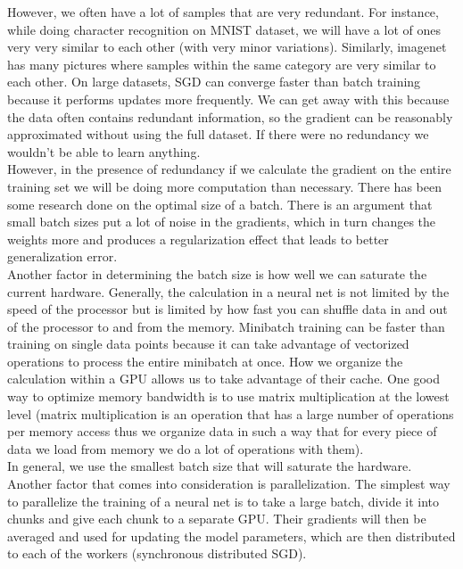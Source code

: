 However, we often have a lot of samples that are very redundant. For instance, while doing character recognition on MNIST dataset, we will have a lot of ones very very similar to each other (with very minor variations). Similarly, imagenet has many pictures where samples within the same category are very similar to each other. On large datasets, SGD can converge faster than batch training because it performs updates more frequently. We can get away with this because the data often contains redundant information, so the gradient can be reasonably approximated without using the full dataset. If there were no redundancy we wouldn’t be able to learn anything.\\

However, in the presence of redundancy if we calculate the gradient on the entire training set we will be doing more computation than necessary. There has been some research done on the optimal size of a batch. There is an argument that small batch sizes put a lot of noise in the gradients, which in turn changes the weights more and produces a  regularization effect that leads to better generalization error.\\

Another factor in determining the batch size is how well we can saturate the current hardware. Generally, the calculation in a neural net is not limited by the speed of the processor but is limited by how fast you can shuffle data in and out of the processor to and from the memory. Minibatch training can be faster than training on single data points because it can take advantage of vectorized operations to process the entire minibatch at once. How we organize the calculation within a GPU allows us to take advantage of their cache. One good way to optimize memory bandwidth is to use matrix multiplication at the lowest level (matrix multiplication is an operation that has a large number of operations per memory access thus we organize data in such a way that for every piece of data we load from memory we do a lot of operations with them).\\

In general, we use the smallest batch size that will saturate the hardware. Another factor that comes into consideration is parallelization. The simplest way to parallelize the training of a neural net is to take a large batch,  divide it into chunks and give each chunk to a separate GPU. Their gradients will then be averaged and used for updating the model parameters, which are then distributed to each of the workers (synchronous distributed SGD).\\

